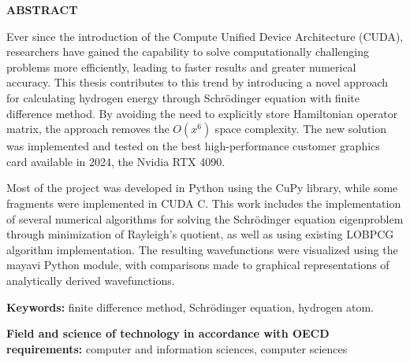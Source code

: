 \noindent
\begingroup
\fontsize{12pt}{1.5pt}\selectfont
\textbf{ABSTRACT}
\endgroup

\vspace{3mm}

Ever since the introduction of the Compute Unified Device Architecture (CUDA), researchers have gained the capability to solve computationally challenging problems more efficiently, leading to faster results and greater numerical accuracy. This thesis contributes to this trend by introducing a novel approach for calculating hydrogen energy through Schr{\"o}dinger equation with finite difference method. By avoiding the need to explicitly store Hamiltonian operator matrix, the approach removes the $O(x^6)$ space complexity. The new solution was implemented and tested on the best high-performance customer graphics card available in 2024, the Nvidia RTX 4090.

Most of the project was developed in Python using the CuPy library, while some fragments were implemented in CUDA C. This work includes the implementation of several numerical algorithms for solving the Schrödinger equation eigenproblem through minimization of Rayleigh's quotient, as well as using existing LOBPCG algorithm implementation. The resulting wavefunctions were visualized using the mayavi Python module, with comparisons made to graphical representations of analytically derived wavefunctions.

\textbf{Keywords:} finite difference method, Schrödinger equation, hydrogen atom.

\textbf{Field and science of technology in accordance with OECD requirements:}
computer and information sciences, computer sciences
